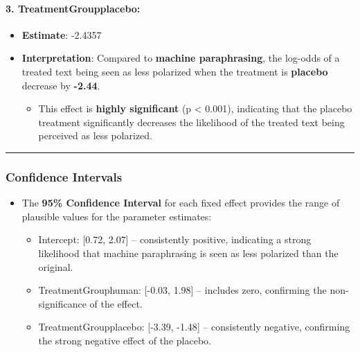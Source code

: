 \documentclass[
]{article}
\providecommand{\tightlist}{%
  \setlength{\itemsep}{0pt}\setlength{\parskip}{0pt}}
\begin{document}
\paragraph{\texorpdfstring{\textbf{3.
TreatmentGroupplacebo:}}{3. TreatmentGroupplacebo:}}\label{treatmentgroupplacebo}

\begin{itemize}
\tightlist
\item
  \textbf{Estimate}: -2.4357
\item
  \textbf{Interpretation}: Compared to \textbf{machine paraphrasing},
  the log-odds of a treated text being seen as less polarized when the
  treatment is \textbf{placebo} decrease by \textbf{-2.44}.

  \begin{itemize}
  \tightlist
  \item
    This effect is \textbf{highly significant} (p \textless{} 0.001),
    indicating that the placebo treatment significantly decreases the
    likelihood of the treated text being perceived as less polarized.
  \end{itemize}
\end{itemize}

\begin{center}\rule{0.5\linewidth}{0.5pt}\end{center}

\subsubsection{\texorpdfstring{\textbf{Confidence
Intervals}}{Confidence Intervals}}\label{confidence-intervals}

\begin{itemize}
\tightlist
\item
  The \textbf{95\% Confidence Interval} for each fixed effect provides
  the range of plausible values for the parameter estimates:

  \begin{itemize}
  \tightlist
  \item
    Intercept: {[}0.72, 2.07{]} -- consistently positive, indicating a
    strong likelihood that machine paraphrasing is seen as less
    polarized than the original.
  \item
    TreatmentGrouphuman: {[}-0.03, 1.98{]} -- includes zero, confirming
    the non-significance of the effect.
  \item
    TreatmentGroupplacebo: {[}-3.39, -1.48{]} -- consistently negative,
    confirming the strong negative effect of the placebo.
  \end{itemize}
\end{itemize}
\end{document}
